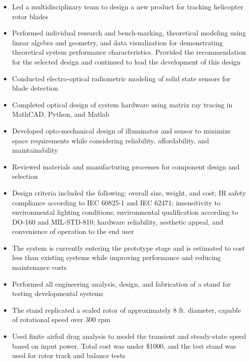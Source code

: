 \documentclass[10pt,a4paper]{article}
\begin{document}
\begin{itemize}
  \item Led a multidisciplinary team to design a new product for tracking helicopter rotor
  blades

  \item Performed individual research and bench-marking, theoretical modeling using linear
  algebra and geometry, and
  data visualization for demonstrating theoretical system performance characteristics. Provided the
  recommendation for the selected design and continued to lead the development of this design

  \item Conducted electro-optical radiometric modeling of solid state sensors for blade
  detection

  \item Completed optical design of system hardware using matrix ray tracing in MathCAD,
  Python, and Matlab

  \item Developed opto-mechanical design of illuminator and sensor to
  minimize space requirements while considering reliability, affordability, and
  maintainability

  \item Reviewed materials and manufacturing processes for component design and selection

  \item Design criteria included the following: overall size, weight, and cost; IR safety
  compliance according to IEC 60825-1 and IEC 62471; insensitivity to environmental
  lighting conditions; environmental qualification according to DO-160 and MIL-STD-810;
  hardware reliability, aesthetic appeal, and convenience of operation to the end user

  \item The system is currently entering the prototype stage and is estimated to cost less than
  existing systems while improving performance and reducing maintenance costs

  \item Performed all engineering analysis, design, and fabrication of a stand for testing
  developmental systems

  \item The stand replicated a scaled rotor of approximately 8 ft. diameter, capable of
  rotational speed over 300 rpm

  \item Used finite airfoil drag analysis to model the transient and steady-state speed based
  on input power. Total cost was under \$1000, and the test stand was used for rotor track
  and balance tests
\end{itemize}
\end{document}
